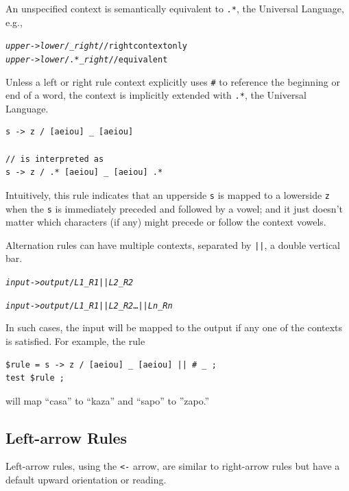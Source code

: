 \noindent
An unspecified context is semantically equivalent to \verb!.*!, the Universal
Language, e.g.,

\begin{alltt}
\emph{upper} -> \emph{lower} /    _ \emph{right}	    // right context only
\emph{upper} -> \emph{lower} / .* _ \emph{right}	    // equivalent
\end{alltt}

Unless a left or right rule context explicitly uses \verb!#! to reference the
beginning or end of a word, the context is implicitly extended with
\verb!.*!, the Universal Language.

\begin{Verbatim}
s -> z / [aeiou] _ [aeiou]

// is interpreted as
s -> z / .* [aeiou] _ [aeiou] .*
\end{Verbatim}

\noindent
Intuitively, this rule indicates that
an upperside \texttt{s} is mapped to a lowerside \texttt{z}
when the \texttt{s} is immediately preceded and followed by a vowel; and it
just doesn't matter which characters (if any) might precede or follow
the context vowels.

Alternation rules can have multiple contexts, separated by \texttt{||}, a double vertical bar.

\begin{alltt}
\emph{input} -> \emph{output} / \emph{L1} _ \emph{R1} || \emph{L2} _ \emph{R2}

\emph{input} -> \emph{output} / \emph{L1} _ \emph{R1} || \emph{L2} _ \emph{R2} \ldots || \emph{Ln} _ \emph{Rn}
\end{alltt}

\noindent
In such cases, the input will be mapped to the output if any one of the
contexts
is satisfied.  For example, the rule

\begin{Verbatim}
$rule = s -> z / [aeiou] _ [aeiou] || # _ ;
test $rule ;
\end{Verbatim}

\noindent
will map ``casa'' to ``kaza'' and ``sapo'' to ''zapo.''

\subsection{Left-arrow Rules}

Left-arrow rules, using the \texttt{<-} arrow, are similar to right-arrow
rules but have a default upward orientation or reading.

